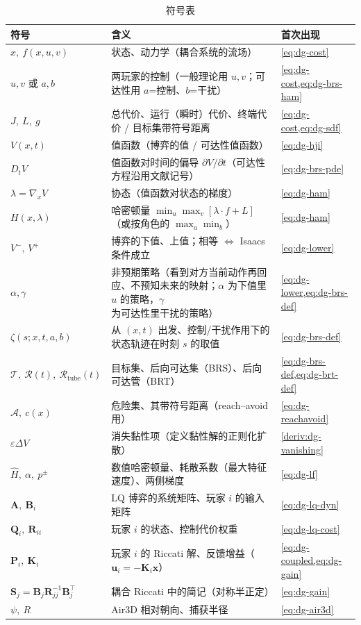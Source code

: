 \begin{table}[H]\centering\small
\caption{符号表}
\label{tab:dg-symbols}
\begin{tabular}{lll}
\toprule
符号 & 含义 & 首次出现 \\
\midrule
$x,\ f(x,u,v)$ & 状态、动力学（耦合系统的流场） & \cref{eq:dg-cost} \\
$u,v$ 或 $a,b$ & 两玩家的控制（一般理论用 $u,v$；可达性用 $a$=控制、$b$=干扰） & \cref{eq:dg-cost,eq:dg-brs-ham} \\
$J,\ L,\ g$ & 总代价、运行（瞬时）代价、终端代价 / 目标集带符号距离 & \cref{eq:dg-cost,eq:dg-sdf} \\
$V(x,t)$ & 值函数（博弈的值 / 可达性值函数） & \cref{eq:dg-hji} \\
$D_t V$ & 值函数对时间的偏导 $\partial V/\partial t$（可达性方程沿用文献记号） & \cref{eq:dg-brs-pde} \\
$\lambda=\nabla_x V$ & 协态（值函数对状态的梯度） & \cref{eq:dg-ham} \\
$H(x,\lambda)$ & 哈密顿量 $\min_u\max_v[\lambda\cdot f+L]$（或按角色的 $\max_a\min_b$） & \cref{eq:dg-ham} \\
$V^-,\,V^+$ & 博弈的下值、上值；相等 $\iff$ Isaacs 条件成立 & \cref{eq:dg-lower} \\
$\alpha,\gamma$ & 非预期策略（看到对方当前动作再回应、不预知未来的映射；$\alpha$ 为下值里 $u$ 的策略，$\gamma$ 为可达性里干扰的策略） & \cref{eq:dg-lower,eq:dg-brs-def} \\
$\zeta(s;x,t,a,b)$ & 从 $(x,t)$ 出发、控制/干扰作用下的状态轨迹在时刻 $s$ 的取值 & \cref{eq:dg-brs-def} \\
$\mathcal{T},\ \mathcal{R}(t),\ \mathcal{R}_{\text{tube}}(t)$ & 目标集、后向可达集（BRS）、后向可达管（BRT） & \cref{eq:dg-brs-def,eq:dg-brt-def} \\
$\mathcal{A},\ c(x)$ & 危险集、其带符号距离（reach--avoid 用） & \cref{eq:dg-reachavoid} \\
$\varepsilon\Delta V$ & 消失黏性项（定义黏性解的正则化扩散） & \cref{deriv:dg-vanishing} \\
$\hat H,\ \alpha,\ p^\pm$ & 数值哈密顿量、耗散系数（最大特征速度）、两侧梯度 & \cref{eq:dg-lf} \\
$\mathbf A,\ \mathbf B_i$ & LQ 博弈的系统矩阵、玩家 $i$ 的输入矩阵 & \cref{eq:dg-lq-dyn} \\
$\mathbf Q_i,\ \mathbf R_{ii}$ & 玩家 $i$ 的状态、控制代价权重 & \cref{eq:dg-lq-cost} \\
$\mathbf P_i,\ \mathbf K_i$ & 玩家 $i$ 的 Riccati 解、反馈增益（$\mathbf u_i=-\mathbf K_i\mathbf x$） & \cref{eq:dg-coupled,eq:dg-gain} \\
$\mathbf S_j=\mathbf B_j\mathbf R_{jj}^{-1}\mathbf B_j^\top$ & 耦合 Riccati 中的简记（对称半正定） & \cref{eq:dg-gain} \\
$\psi,\ R$ & Air3D 相对朝向、捕获半径 & \cref{eq:dg-air3d} \\
\bottomrule
\end{tabular}
\end{table}

